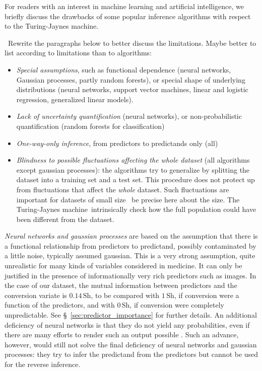 \documentclass[utf8]{FrontiersinHarvard} %
\newcommand*{\wrench}{{\fontencoding{U}\fontfamily{fontawesomethree}\selectfont\symbol{114}}}
\newcommand*{\pencil}{{\fontencoding{U}\fontfamily{fontawesometwo}\selectfont\symbol{210}}}
\newcommand{\mynotew}[1]{{\color{notecolour}\wrench\ #1}}
\newcommand{\mynotep}[1]{{\color{notecolour}\pencil\ #1}}
\newcommand*{\sect}{\S}%
\renewcommand*{\|}[1][]{\nonscript\:#1\vert\nonscript\:\mathopen{}}
\newcommand*{\tjm}{Turing-Jaynes machine}
\begin{document}
For readers with an interest in machine learning and artificial intelligence, we briefly discuss the drawbacks of some popular inference algorithms with respect to the \tjm. \mynotew{Rewrite the paragraphs below to better discuss the limitations. Maybe better to list according to limitations than to algorithms:
  \begin{itemize}
  \item \emph{Special assumptions}, such as functional dependence (neural networks, Gaussian processes, partly random forests), or special shape of underlying distributions (neural networks, support vector machines, linear and logistic regression, generalized linear models).
  \item \emph{Lack of uncertainty quantification} (neural networks), or non-probabilistic quantification (random forests for classification)
  \item \emph{One-way-only inference}, from predictors to predictands only (all)
  \item \emph{Blindness to possible fluctuations affecting the whole dataset} (all algorithms except gaussian processes): the algorithms try to generalize by splitting the dataset into a training set and a test set. This procedure does not protect up from fluctuations that affect the \emph{whole} dataset. Such fluctuations are important for datasets of small size \mynotep{be precise here about the size}. The \tjm\ intrinsically check how the full population could have been different from the dataset.
  \end{itemize}
}

\emph{Neural networks and gaussian processes} are based on the assumption that there is a functional relationship from predictors to predictand, possibly contaminated by a little noise, typically assumed gaussian. This is a very strong assumption, quite unrealistic for many kinds of variables considered in medicine. It can only be justified in the presence of informationally very rich predictors such as images. In the case of our dataset, the mutual information between predictors and the conversion variate is $0.14\,\mathrm{Sh}$, to be compared with $1\,\mathrm{Sh}$, if conversion were a function of the predictors, and with $0\,\mathrm{Sh}$, if conversion were completely unpredictable. See \sect~\ref{sec:predictor_importance} for further details. An additional deficiency of neural networks is that they do not yield any probabilities, even if there are many efforts to render such an output possible \citep{pearceetal2020,osbandetal2021,backetal2019}. Such an advance, however, would still not solve the final deficiency of neural networks and gaussian processes: they try to infer the predictand from the predictors but cannot be used for the reverse inference.
\end{document}
